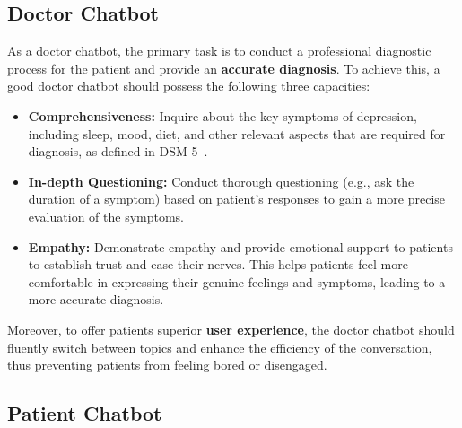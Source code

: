 \subsection{Doctor Chatbot}
\label{sec:doc_requirements}
As a doctor chatbot, the primary task is to conduct a professional diagnostic process for the patient and provide an \textbf{accurate diagnosis}. To achieve this, a good doctor chatbot should possess the following three capacities:
\begin{itemize}
    \item \textbf{Comprehensiveness:} Inquire about the key symptoms of depression, including sleep, mood, diet, and other relevant aspects that are required for diagnosis, as defined in DSM-5~\cite{american2013diagnostic}.
    \item \textbf{In-depth Questioning:} Conduct thorough questioning (e.g., ask the duration of a symptom) based on patient's responses to gain a more precise evaluation of the symptoms.
    \item \textbf{Empathy:} Demonstrate empathy and provide emotional support to patients to establish trust and ease their nerves. This helps patients feel more comfortable in expressing their genuine feelings and symptoms, leading to a more accurate diagnosis.
\end{itemize}
Moreover, to offer patients superior \textbf{user experience}, the doctor chatbot should fluently switch between topics and enhance the efficiency of the conversation, thus preventing patients from feeling bored or disengaged.
\subsection{Patient Chatbot}
\label{sec:pat_requirements}


